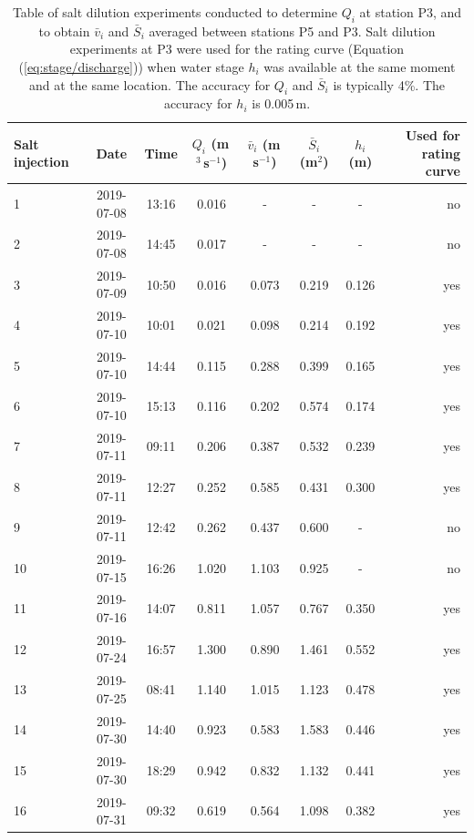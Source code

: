 \begin{table}[H]
\centering
\caption{Table of salt dilution experiments conducted to determine $Q_i$ at station P3, and to obtain $\bar v_i$ and $\bar S_i$ averaged between stations P5 and P3. Salt dilution experiments at P3 were used for the rating curve (Equation (\ref{eq:stage/discharge})) when water stage $h_i$ was available at the same moment and at the same location. The accuracy for $Q_i$ and $\bar S_i$ is typically 4\%. The accuracy for $h_i$ is 0.005\,m.}
\begin{tabular}{l c c c c c c r}
\hline
\textbf{Salt injection} & \textbf{Date} & \textbf{Time} & \textbf{$Q_i$ (m\,$^3$\,s$^{-1}$}) & \textbf{$\bar v_i$ (m\,s$^{-1}$)} & \textbf{$\bar S_i$ (m$^2$)} & \textbf{$h_i$ (m)} & \textbf{Used for rating curve}\\
\hline

1 & 2019-07-08 & 13:16 &  0.016  & - & - & - &no\\
2 & 2019-07-08 & 14:45 &  0.017 & - & - & - &no \\
3 & 2019-07-09 & 10:50 &  0.016 & 0.073 & 0.219 & 0.126 &yes\\
4 & 2019-07-10 & 10:01 &  0.021 & 0.098 & 0.214 & 0.192 &yes \\
5 & 2019-07-10 & 14:44 &  0.115 & 0.288 & 0.399 & 0.165 &yes \\
6 & 2019-07-10 & 15:13 & 0.116 & 0.202 & 0.574 & 0.174 &yes\\
7 & 2019-07-11 & 09:11 &  0.206 & 0.387 & 0.532 & 0.239 &yes \\
8 & 2019-07-11 & 12:27 &  0.252 & 0.585 & 0.431 & 0.300 &yes\\
9 & 2019-07-11 & 12:42 &  0.262 & 0.437 & 0.600 & - &no\\
10 & 2019-07-15 & 16:26 &  1.020 & 1.103 & 0.925 & - &no\\
11 & 2019-07-16 & 14:07 &  0.811 & 1.057 & 0.767 & 0.350 &yes \\
12 & 2019-07-24 & 16:57 &  1.300 & 0.890 & 1.461 & 0.552 &yes \\
13 & 2019-07-25 & 08:41 &  1.140 & 1.015 & 1.123 & 0.478 &yes\\
14 & 2019-07-30 & 14:40 &  0.923 & 0.583 & 1.583 & 0.446 &yes \\
15 & 2019-07-30 & 18:29 &  0.942 & 0.832 & 1.132 & 0.441 & yes\\
16 & 2019-07-31 & 09:32 &  0.619 & 0.564 & 1.098 & 0.382 & yes \\

\hline
\end{tabular}
\label{table salt dilution}
\end{table}


